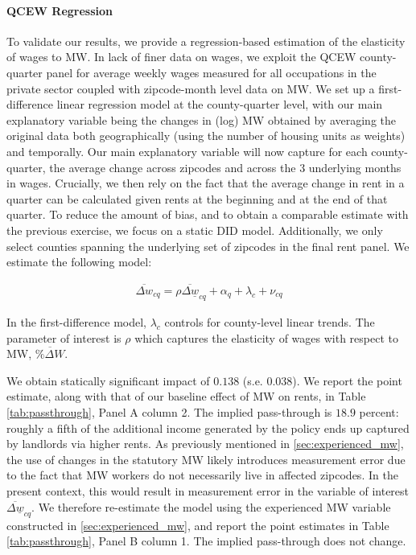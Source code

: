 \paragraph{QCEW Regression} To validate our results, we provide a 
regression-based estimation of the elasticity of wages to MW. In lack of finer data on wages, 
we exploit the QCEW county-quarter panel for average weekly wages measured for all occupations 
in the private sector coupled with zipcode-month level data on MW. We set up a first-difference 
linear regression model at the county-quarter level, with our main explanatory variable being the 
changes in (log) MW obtained by averaging the original data both geographically (using the 
number of housing units as weights) and temporally. Our main explanatory variable will now capture 
for each county-quarter, the average change across zipcodes and across the 3 underlying months 
in wages. Crucially, we then rely on the fact that the average change in rent in a quarter can be calculated 
given rents at the beginning and at the end of that quarter. To reduce the amount of bias, and to obtain 
a comparable estimate with the previous exercise, we focus on a static DID model. Additionally, we only 
select counties spanning the underlying set of zipcodes in the final rent panel. We estimate the following model: 

\begin{align}
	\overline{\Delta w}_{cq} = \rho \overline{\Delta \underline{w}}_{cq} + \alpha_{q} + \lambda_{c} + \nu_{cq}
\end{align}

In the first-difference model, $\lambda_{c}$ controls for county-level linear trends. 
The parameter of interest is $\rho$ which captures the elasticity of wages with respect to 
MW, $\overline{\% \Delta W}$. 

We obtain statically significant impact of $0.138$ (s.e. $0.038$). 
We report the point estimate, along with that of our baseline effect of MW on rents, in 
Table \ref{tab:passthrough}, Panel A column 2. The implied pass-through is $18.9$ percent: 
roughly a fifth of the additional income generated by the policy ends up captured by landlords 
via higher rents. As previously mentioned in \autoref{sec:experienced_mw}, the use of changes in the statutory 
MW likely introduces measurement error due to the fact that MW workers do not necessarily 
live in affected zipcodes. In the present context, this would result in measurement error in 
the variable of interest $\overline{\Delta \underline{w}}_{cq}$. We therefore re-estimate the model 
using the experienced MW variable constructed in \autoref{sec:experienced_mw}, and report the point 
estimates in Table \ref{tab:passthrough}, Panel B column 1. The implied pass-through does not
change. \\

